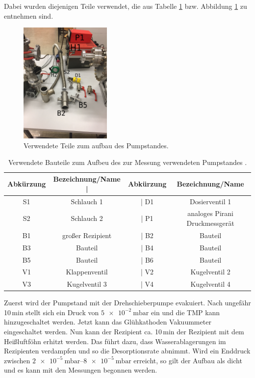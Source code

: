 Dabei wurden diejenigen Teile verwendet, die aus Tabelle \ref{tab:Teile} bzw. Abbildung
\ref{fig:Teile} zu entnehmen sind.

\begin{figure}
  \centering
  \includegraphics[width=0.4\textwidth]{IMG_6891.JPG}
  \caption{Verwendete Teile zum aufbau des Pumpstandes.}
  \label{fig:Teile}
\end{figure}

\begin{table}
  \caption{Verwendete Bauteile zum Aufbeu des zur Messung verwendeten Pumpstandes \cite{anleitung}.}
  \label{tab:Teile}
  \begin{tabular}{cccc}
    \toprule
    Abkürzung & Bezeichnung/Name |& Abkürzung & Bezeichnung/Name \\
    \midrule
    S1 & Schlauch 1 &| D1 & Dosierventil 1 \\
    S2 & Schlauch 2 &| P1 & analoges Pirani Druckmessgerät \\
    B1 & großer Rezipient &| B2 & Bauteil \\
    B3 & Bauteil &| B4 & Bauteil \\
    B5 & Bauteil &| B6 & Bauteil \\
    V1 & Klappenventil &| V2 & Kugelventil 2 \\
    V3 & Kugelventil 3 &| V4 & Kugelventil 4 \\
  \end{tabular}
\end{table}
Zuerst wird der Pumpstand mit der Drehschieberpumpe evakuiert. Nach ungefähr 10$\,$min
stellt sich ein Druck von $\SI{5e-2}{\milli\bar}$ ein und die TMP kann hinzugeschaltet
werden.
Jetzt kann das Glühkathoden Vakuummeter eingeschaltet werden. Nun kann der Rezipient
ca. 10$\,$min der Rezipient mit dem Heißluftföhn erhitzt werden. Das führt dazu,
dass Wasserablagerungen im Rezipienten verdampfen und so die Desorptionsrate abnimmt.
Wird ein Enddruck zwischen $\SIrange{2e-5}{8e-5}{\milli\bar}$ erreicht, so gilt der
Aufbau als dicht und es kann mit den Messungen begonnen werden.


